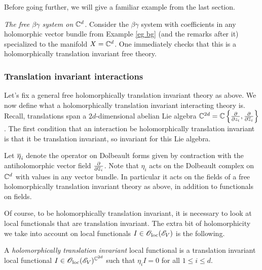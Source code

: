 Before going further, we will give a familiar example from the last section.

\begin{eg}\label{eg bg affine} {\em The free $\beta\gamma$ system on $\CC^d$}.
Consider the $\beta\gamma$ system with coefficients in any holomorphic vector bundle from Example \ref{eg bg} (and the remarks after it) specialized to the manifold $X = \CC^d$.
One immediately checks that this is a holomorphically translation invariant free theory.
\end{eg}


\subsubsection{Translation invariant interactions}

Let's fix a general free holomorphically translation invariant theory as above.
We now define what a holomorphically translation invariant interacting theory is.
Recall, translations span a $2d$-dimensional abelian Lie algebra $\CC^{2d} = \CC\left\{\frac{\partial}{\partial z_i}, \frac{\partial}{\partial \zbar_i}\right\}$. 
The first condition that an interaction be holomorphically translation invariant is that it be translation invariant, so invariant for this Lie algebra.

Let $\Bar{\eta}_i$ denote the operator on Dolbeault forms given by contraction with the antiholomorphic vector field $\frac{\partial}{\partial \zbar_i}$. 
Note that $\eta_i$ acts on the Dolbeault complex on $\CC^d$ with values in any vector bundle.
In particular it acts on the fields of a free holomorphically translation invariant theory as above, in addition to functionals on fields.

Of course, to be holomorphically translation invariant, it is necessary to look at local functionals that are translation invariant.
The extra bit of holomorphicity we take into account on local functionals $I \in \oloc(\sE_V)$ is the following.

\begin{dfn}
A {\em holomorphically translation invariant} local functional is a translation invariant local functional $I \in \oloc(\sE_V)^{\CC^{2d}}$ such that $\eta_i I = 0$ for all $1 \leq i \leq d$. 
\end{dfn}

